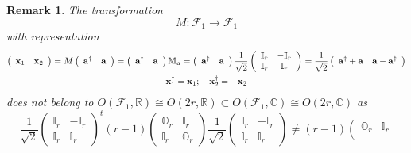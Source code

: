 \documentclass[aps, preprint]{revtex4}
\newtheorem{remark}[theorem]{Remark}
\begin{document}
\begin{remark}
The transformation
\begin{equation}M :\mathcal{F}_{1} \rightarrow \mathcal{F}_{1}
\end{equation}with representation
\begin{gather}\left (\begin{array}{cc}\mathbf{x}_{1} & \mathbf{x}_{2}\end{array}\right ) =M \left (\begin{array}{cc}\mathbf{a}^{ \dag } & \mathbf{a}\end{array}\right ) =\left (\begin{array}{cc}\mathbf{a}^{ \dag } & \mathbf{a}\end{array}\right ) \mathbb{M}_{a} =\left (\begin{array}{cc}\mathbf{a}^{ \dag } & \mathbf{a}\end{array}\right ) \frac{1}{\sqrt{2}} \left (\begin{array}{cc}\mathbb{I}_{r} &  -\mathbb{I}_{r} \\
\mathbb{I}_{r} & \mathbb{I}_{r}\end{array}\right ) =\frac{1}{\sqrt{2}} \left (\begin{array}{cc}\mathbf{a}^{ \dag } +\mathbf{a} & \mathbf{a} -\mathbf{a}^{ \dag }\end{array}\right ) \\
\mathbf{x}_{1}^{ \dag } =\mathbf{x}_{1} ;\text{\quad }\mathbf{x}_{2}^{ \dag } = -\mathbf{x}_{2}\end{gather}\emph{does not belong to} $O \left (\mathcal{F}_{1} ,\mathbb{R}\right ) \cong O \left (2 r ,\mathbb{R}\right ) \subset O \left (\mathcal{F}_{1} ,\mathbb{C}\right ) \cong O \left (2 r ,\mathbb{C}\right )$ as
\begin{equation}\frac{1}{\sqrt{2}} \left (\begin{array}{cc}\mathbb{I}_{r} &  -\mathbb{I}_{r} \\
\mathbb{I}_{r} & \mathbb{I}_{r}\end{array}\right )^{t} \left (r -1\right ) \left (\begin{array}{cc}\mathbb{O}_{r} & \mathbb{I}_{r} \\
\mathbb{I}_{r} & \mathbb{O}_{r}\end{array}\right ) \frac{1}{\sqrt{2}} \left (\begin{array}{cc}\mathbb{I}_{r} &  -\mathbb{I}_{r} \\
\mathbb{I}_{r} & \mathbb{I}_{r}\end{array}\right ) \neq \left (r -1\right ) \left (\begin{array}{cc}\mathbb{O}_{r} & \mathbb{I}_{r} \\

\end{array}
\end{equation}
\end{remark}
\end{document}
